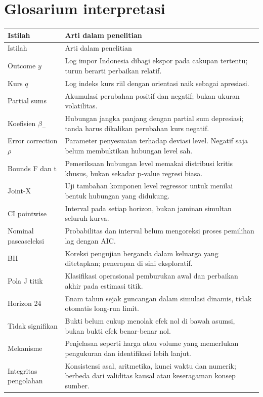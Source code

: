 \clearpage\section{Glosarium interpretasi}
\begin{longtable}{p{.24\linewidth}p{.65\linewidth}}
\toprule Istilah & Arti dalam penelitian\\\midrule\endfirsthead
\toprule Istilah & Arti dalam penelitian\\\midrule\endhead
Outcome $y$ & Log impor Indonesia dibagi ekspor pada cakupan tertentu; turun berarti perbaikan relatif.\\
Kurs $q$ & Log indeks kurs riil dengan orientasi naik sebagai apresiasi.\\
Partial sums & Akumulasi perubahan positif dan negatif; bukan ukuran volatilitas.\\
Koefisien $\beta_-$ & Hubungan jangka panjang dengan partial sum depresiasi; tanda harus dikalikan perubahan kurs negatif.\\
Error correction $\rho$ & Parameter penyesuaian terhadap deviasi level. Negatif saja belum membuktikan hubungan level sah.\\
Bounds F dan t & Pemeriksaan hubungan level memakai distribusi kritis khusus, bukan sekadar p-value regresi biasa.\\
Joint-X & Uji tambahan komponen level regressor untuk menilai bentuk hubungan yang didukung.\\
CI pointwise & Interval pada setiap horizon, bukan jaminan simultan seluruh kurva.\\
Nominal pascaseleksi & Probabilitas dan interval belum mengoreksi proses pemilihan lag dengan AIC.\\
BH & Koreksi pengujian berganda dalam keluarga yang ditetapkan; penerapan di sini eksploratif.\\
Pola J titik & Klasifikasi operasional pemburukan awal dan perbaikan akhir pada estimasi titik.\\
Horizon 24 & Enam tahun sejak guncangan dalam simulasi dinamis, tidak otomatis long-run limit.\\
Tidak signifikan & Bukti belum cukup menolak efek nol di bawah asumsi, bukan bukti efek benar-benar nol.\\
Mekanisme & Penjelasan seperti harga atau volume yang memerlukan pengukuran dan identifikasi lebih lanjut.\\
Integritas pengolahan & Konsistensi asal, aritmetika, kunci waktu dan numerik; berbeda dari validitas kausal atau keseragaman konsep sumber.\\
\bottomrule\end{longtable}

